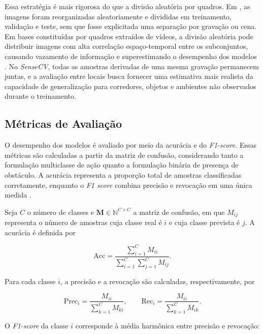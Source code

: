 \documentclass[conference]{IEEEtran}
\newcommand{\sensecv}{\textit{SenseCV}}
\begin{document}
Essa estratégia é mais rigorosa do que a divisão aleatória por quadros. Em \cite{medeiros2021}, as imagens foram reorganizadas aleatoriamente e divididas em treinamento, validação e teste, sem que fosse explicitada uma separação por gravação ou cena. Em bases constituídas por quadros extraídos de vídeos, a divisão aleatória pode distribuir imagens com alta correlação espaço-temporal entre os subconjuntos, causando vazamento de informação e superestimando o desempenho dos modelos \cite{figueiredo2024leakage}. No \sensecv{}, todas as amostras derivadas de uma mesma gravação permanecem juntas, e a avaliação entre locais busca fornecer uma estimativa mais realista da capacidade de generalização para corredores, objetos e ambientes não observados durante o treinamento.

\subsection{Métricas de Avaliação}

O desempenho dos modelos é avaliado por meio da acurácia e do \emph{F1-score}. Essas métricas são calculadas a partir da matriz de confusão, considerando tanto a formulação multiclasse de ação quanto a formulação binária de presença de obstáculo. A acurácia representa a proporção total de amostras classificadas corretamente, enquanto o \emph{F1 score} combina precisão e revocação em uma única medida \cite{rainio2024metrics}.

Seja $C$ o número de classes e $\mathbf{M}\in\mathbb{N}^{C\times C}$ a matriz de confusão, em que $M_{ij}$ representa o número de amostras cuja classe real é $i$ e cuja classe prevista é $j$. A acurácia é definida por

\begin{equation}
\mathrm{Acc} =
\frac{\displaystyle\sum_{i=1}^{C} M_{ii}}
{\displaystyle\sum_{i=1}^{C}\sum_{j=1}^{C} M_{ij}}.
\label{eq:accuracy}
\end{equation}

Para cada classe $i$, a precisão e a revocação são calculadas,
respectivamente, por

\begin{equation}
\mathrm{Prec}_{i} =
\frac{M_{ii}}
{\displaystyle\sum_{k=1}^{C}M_{ki}},
\qquad
\mathrm{Rec}_{i} =
\frac{M_{ii}}
{\displaystyle\sum_{k=1}^{C}M_{ik}}.
\label{eq:precision_recall}
\end{equation}

O \emph{F1-score} da classe $i$ corresponde à média harmônica entre precisão e
revocação:
\end{document}
